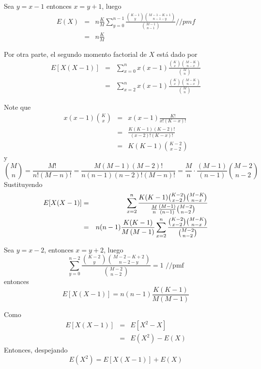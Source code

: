 \begin{i}
Sea $y=x-1$ entonces $x=y+1$, luego 
\begin{eqnarray*}
E(X) &=&n\frac{K}{M}\sum_{y=0}^{n-1}\frac{\binom{K-1}{y}\binom{M-1-K+1}{n-1-y%
}}{\binom{M-1}{n-1}}//pmf \\
&=&n\frac{K}{M}
\end{eqnarray*}

Por otra parte, el segundo momento factorial de $X$ está dado por%
\begin{eqnarray*}
E[X(X-1)] &=&\sum_{x=0}^{n}x(x-1)\frac{\binom{K}{x}\binom{M-K}{n-x}}{\binom{M%
}{n}} \\
&=&\sum_{x=2}^{n}x(x-1)\frac{\binom{K}{x}\binom{M-K}{n-x}}{\binom{M}{n}}
\end{eqnarray*}

Note que
\begin{eqnarray*}
x(x-1)\binom{K}{x} &=&x(x-1)\frac{K!}{x!(K-x)!} \\
&=&\frac{K(K-1)(K-2)!}{(x-2)!(K-x)!} \\
&=&K(K-1)\binom{K-2}{x-2}
\end{eqnarray*}
y 
\begin{equation*}
\binom{M}{n}=\frac{M!}{n!(M-n)!}=\frac{M(M-1)(M-2)!}{n(n-1)(n-2)!(M-n)!}=
\frac{M}{n}\cdot \frac{\left( M-1\right) }{\left( n-1\right) }\binom{M-2}{n-2
}
\end{equation*}
Sustituyendo
\begin{eqnarray*}
E[X(X-1)] &=&\sum_{x=2}^{n}\frac{K(K-1)\binom{K-2}{x-2}\binom{M-K}{n-x}}{%
\frac{M}{n}\frac{\left( M-1\right) }{\left( n-1\right) }\binom{M-2}{n-2}} \\
&=&n(n-1)\frac{K(K-1)}{M\left( M-1\right) }\sum_{x=2}^{n}\frac{\binom{K-2}{
x-2}\binom{M-K}{n-x}}{\binom{M-2}{n-2}}
\end{eqnarray*}

Sea $y=x-2$, entonces $x=y+2$, luego
\begin{equation*}
\sum_{y=0}^{n-2}\frac{\binom{K-2}{y}\binom{M-2-K+2}{n-2-y}}{\binom{M-2}{n-2}}
=1\text{ //pmf}
\end{equation*}
entonces
\begin{equation*}
E[X(X-1)]=n(n-1)\frac{K(K-1)}{M\left( M-1\right) }
\end{equation*}

Como
\begin{eqnarray*}
E[X(X-1)] &=&E[X^{2}-X] \\
&=&E(X^{2})-E(X)
\end{eqnarray*}
Entonces, despejando
\begin{equation*}
E(X^{2})=E[X(X-1)]+E(X)
\end{equation*}


\end{i}
